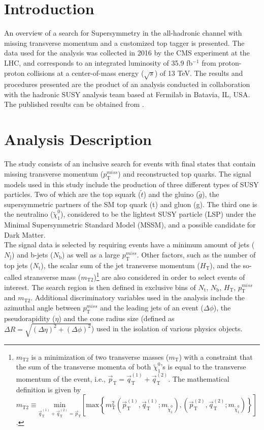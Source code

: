 \section{Introduction}

An overview of a search for Supersymmetry in the all-hadronic channel with missing transverse momentum and a customized top tagger is presented. The data used for the analysis was collected in 2016 by the CMS experiment at the LHC, and corresponds to an integrated luminosity of 35.9 fb$^{-1}$ from proton-proton collisions at a center-of-mass energy ($\sqrt{s}$) of 13 TeV. The results and procedures presented are the product of an analysis conducted in collaboration with the hadronic SUSY analysis team based at Fermilab in Batavia, IL, USA. The published results can be obtained from \cite{SUSYanalysis}.

\section{Analysis Description}

The study consists of an inclusive search for events with final states that contain missing transverse momentum ($p_{\text{T}}^{miss}$) and reconstructed top quarks. The signal models used in this study include the production of three different types of SUSY particles. Two of which are the top squark ($\tilde{t}$) and the gluino ($\tilde{g}$), the supersymmetric partners of the SM top quark (t) and gluon (g). The third one is the neutralino ($\tilde{\chi}_{1}^{0}$), considered to be the lightest SUSY particle (LSP) under the Minimal Supersymmetric Standard Model (MSSM), and a possible candidate for Dark Matter.\\

The signal data is selected by requiring events have a minimum amount of jets ($N_\text{j}$) and b-jets ($N_\text{b}$) as well as a large $p_{\text{T}}^{miss}$. Other factors, such as the number of top jets ($N_\text{t}$), the scalar sum of the jet transverse momentum ($H_\text{T}$), and the so-called stransverse mass ($m_\text{T2}$)\footnote{$m_\text{T2}$ is a minimization of two transverse masses ($m_\text{T}$) with a constraint that the sum of the transverse momenta of both $\tilde{\chi}_{1}^{0}$'s is equal to the transverse momentum of the event, i.e., $\vec{p}_\text{T} = \vec{q}_\text{T}^{(1)} + \vec{q}_\text{T}^{(2)}$. The mathematical definition is given by $m_\text{T2} \equiv \underset{\vec{q}_\text{T}^{(1)} + \vec{q}_\text{T}^{(2)} = \vec{p}_\text{T}}{\text{min}}\left [ \text{max}\left \{ m_\text{T}^2 (\vec{p}_\text{T}^{(1)}, \vec{q}_\text{T}^{(1)}; m_{\tilde{\chi}_{1}^{0}}), (\vec{p}_\text{T}^{(2)}, \vec{q}_\text{T}^{(2)}; m_{\tilde{\chi}_{1}^{0}}) \right \} \right ]$.} are also considered in order to select events of interest. The search region is then defined in exclusive bins of $N_\text{t}$, $N_\text{b}$, $H_\text{T}$, $p_{\text{T}}^{miss}$ and $m_\text{T2}$. Additional discriminatory variables used in the analysis include the azimuthal angle between $p_{\text{T}}^{miss}$ and the leading jets of an event ($\Delta\phi$), the pseudorapidity ($\eta$) and the cone radius size (defined as $\Delta R = \sqrt{(\Delta\eta)^2+(\Delta\phi)^2}$) used in the isolation of various physics objects.

